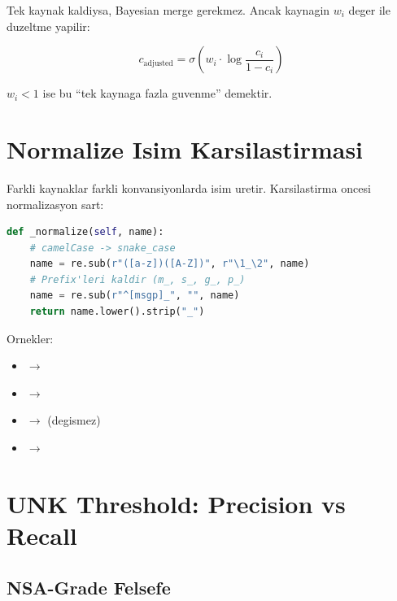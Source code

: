 Tek kaynak kaldiysa, Bayesian merge gerekmez. Ancak kaynagin $w_i$ deger ile duzeltme yapilir:

\begin{equation}
c_{\text{adjusted}} = \sigma\left(w_i \cdot \log\frac{c_i}{1 - c_i}\right)
\end{equation}

$w_i < 1$ ise bu ``tek kaynaga fazla guvenme'' demektir.


\section{Normalize Isim Karsilastirmasi}
\label{sec:normalize}

Farkli kaynaklar farkli konvansiyonlarda isim uretir. Karsilastirma oncesi normalizasyon sart:

\begin{lstlisting}[language=Python, caption={Isim normalizasyonu -- name\_merger.py}]
def _normalize(self, name):
    # camelCase -> snake_case
    name = re.sub(r"([a-z])([A-Z])", r"\1_\2", name)
    # Prefix'leri kaldir (m_, s_, g_, p_)
    name = re.sub(r"^[msgp]_", "", name)
    return name.lower().strip("_")
\end{lstlisting}

Ornekler:
\begin{itemize}
\item {} $\to$ 
\item {} $\to$ 
\item {} $\to$  (degismez)
\item {} $\to$ 
\end{itemize}


\section{UNK Threshold: Precision vs Recall}
\label{sec:unk-threshold}

\subsection{NSA-Grade Felsefe}

